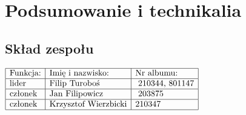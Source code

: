 \documentclass[a4paper,12pt,twoside]{article}
\theoremstyle{plain}
\theoremstyle{definition}
\theoremstyle{remark}
\begin{document}
%
\tableofcontents
\newpage
\section{Podsumowanie i technikalia}
\subsection{Skład zespołu}
$\begin{array}{|l|l|l|}
	\hline
	\textrm{Funkcja:}& \textrm{Imię i nazwisko: }& \textrm{Nr albumu: }\\
	\hline
	\textrm{lider}& \textrm{Filip Turoboś}&\textrm{ 210344, 801147}\\
	\hline
	\textrm{członek}&\textrm{Jan Filipowicz}&\textrm{	203875 	}\\
	\hline
	\textrm{członek}&\textrm{Krzysztof Wierzbicki}& \textrm{210347}\\
	\hline
\end{array}$
\end{document}
